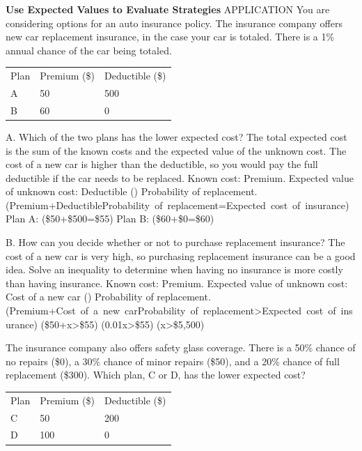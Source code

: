 \documentclass{article}
\newenvironment{example}[1]{}{}         %
\newenvironment{tryit}[1]{}{}           %
\newcommand{\answer}[1]{}               %
\newcommand{\te}[1]{}                   %
\begin{document}
\begin{example}{3}
\textbf{Use Expected Values to Evaluate Strategies}
APPLICATION
You are considering options for an auto insurance policy. The insurance company offers new car replacement insurance, in the case your car is totaled. There is a 1\% annual chance of the car being totaled.
\begin{tabular}{lll}
Plan & Premium (\$) & Deductible (\$) \\
A & 50 & 500 \\
B & 60 & 0 \\
\end{tabular}
\te{Callout: The deductible is the portion of the cost that the car owner pays.}
A. Which of the two plans has the lower expected cost?
The total expected cost is the sum of the known costs and the expected value of the unknown cost. The cost of a new car is higher than the deductible, so you would pay the full deductible if the car needs to be replaced.
Known cost: Premium. Expected value of unknown cost: Deductible (\cdot) Probability of replacement.
(Premium+Deductible\cdot Probability\ of\ replacement=Expected\ cost\ of\ insurance)
Plan A: (\$50+\$500=\$55)
Plan B: (\$60+\$0=\$60)
\answer{Plan A has the lower expected cost.}
\te{CONSTRUCT ARGUMENTS. If the expected costs were the same, what other criteria could the car owner use to decide? Why might the insurance company offer two different plans with the same expected cost?}
B. How can you decide whether or not to purchase replacement insurance?
The cost of a new car is very high, so purchasing replacement insurance can be a good idea. Solve an inequality to determine when having no insurance is more costly than having insurance.
Known cost: Premium. Expected value of unknown cost: Cost of a new car (\cdot) Probability of replacement.
(Premium+Cost\ of\ a\ new\ car\cdot Probability\ of\ replacement>Expected\ cost\ of\ insurance)
(\$50+x>\$55)
(0.01x>\$55)
(x>\$5,500)
\te{Printed \$50 premium on the uninsured side in the first line, then omitted; likely no premium should be included for no insurance.}
\te{Callout: With or without insurance, you have the same chance of needing a new car.}
\answer{You should buy replacement insurance if the cost of a new car is greater than \$5,500.}
\end{example}
\begin{tryit}{3}
The insurance company also offers safety glass coverage. There is a 50\% chance of no repairs (\$0), a 30\% chance of minor repairs (\$50), and a 20\% chance of full replacement (\$300). Which plan, C or D, has the lower expected cost?
\begin{tabular}{lll}
Plan & Premium (\$) & Deductible (\$) \\
C & 50 & 200 \\
D & 100 & 0 \\
\end{tabular}
\answer{Plan D}
\end{tryit}
\end{document}
